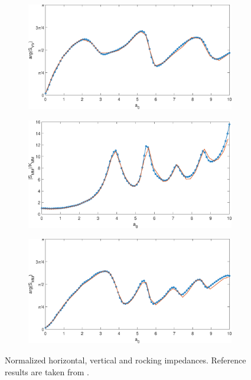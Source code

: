 \documentclass[a4]{article}
\begin{document}
\begin{figure}[tbh!]
\begin{subfigure}[b]{0.48\textwidth}
		\label{fig:Svv}
	\end{subfigure}
	\begin{subfigure}[b]{0.48\textwidth}
		\centering
		\includegraphics[width=\textwidth]{arg_Svv.eps}
		\label{fig:arg_Svv}
	\end{subfigure}    
		\begin{subfigure}[b]{0.48\textwidth}
		\centering
		\includegraphics[width=\textwidth]{Smm.eps}
		\label{fig:Smm}
	\end{subfigure}
	\begin{subfigure}[b]{0.48\textwidth}
		\centering
		\includegraphics[width=\textwidth]{arg_Smm.eps}
		\label{fig:arg_Smm}
	\end{subfigure}    
	\caption{Normalized horizontal, vertical and rocking impedances. Reference results are taken from \cite{liingaard}.}
	\label{fig:results}
\end{figure}
\end{document}
